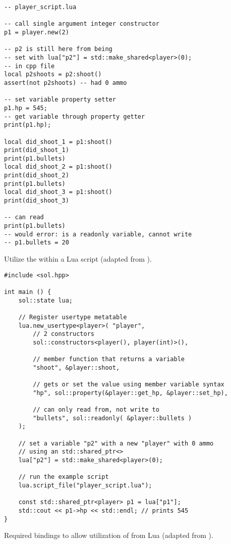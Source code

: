 \begin{listing}[hp]
\begin{verbatim}
-- player_script.lua

-- call single argument integer constructor
p1 = player.new(2)

-- p2 is still here from being
-- set with lua["p2"] = std::make_shared<player>(0);
-- in cpp file
local p2shoots = p2:shoot()
assert(not p2shoots) -- had 0 ammo

-- set variable property setter
p1.hp = 545;
-- get variable through property getter
print(p1.hp);

local did_shoot_1 = p1:shoot()
print(did_shoot_1)
print(p1.bullets)
local did_shoot_2 = p1:shoot()
print(did_shoot_2)
print(p1.bullets)
local did_shoot_3 = p1:shoot()
print(did_shoot_3)

-- can read
print(p1.bullets)
-- would error: is a readonly variable, cannot write
-- p1.bullets = 20
\end{verbatim}
\caption{Utilize the  within a Lua script (adapted from \cite{Github:ThePhD:sol2:cxx-in-lua}).}
\label{lst:lua:sol2-example:usage}
\end{listing}

\begin{listing}[hp]
\begin{verbatim}
#include <sol.hpp>

int main () {
    sol::state lua;
    
    // Register usertype metatable
    lua.new_usertype<player>( "player",
        // 2 constructors
        sol::constructors<player(), player(int)>(),
        
        // member function that returns a variable
        "shoot", &player::shoot,
        
        // gets or set the value using member variable syntax
        "hp", sol::property(&player::get_hp, &player::set_hp),
        
        // can only read from, not write to
        "bullets", sol::readonly( &player::bullets )
    );
    
    // set a variable "p2" with a new "player" with 0 ammo
    // using an std::shared_ptr<>
    lua["p2"] = std::make_shared<player>(0);
    
    // run the example script
    lua.script_file("player_script.lua");
    
    const std::shared_ptr<player> p1 = lua["p1"];
    std::cout << p1->hp << std::endl; // prints 545
}
\end{verbatim}
\caption{Required bindings to allow utilization of  from Lua (adapted from \cite{Github:ThePhD:sol2:cxx-in-lua}).}
\label{lst:lua:sol2-example:bindings}
\end{listing}

